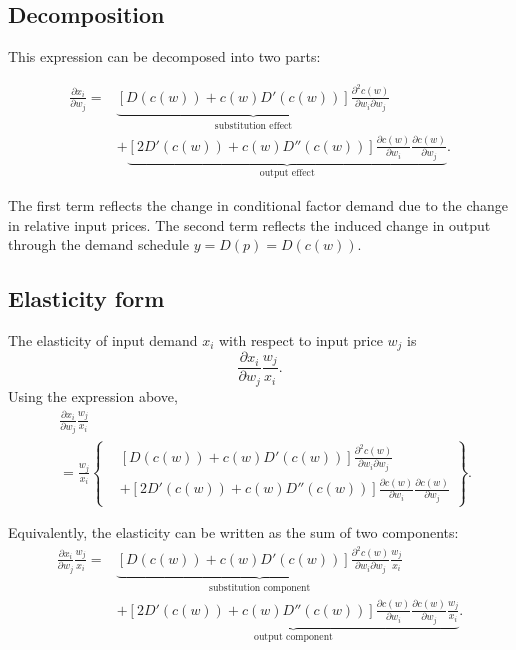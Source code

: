 \subsection*{Decomposition}

This expression can be decomposed into two parts:

\[
\begin{aligned}
\frac{\partial x_i}{\partial w_j}
=
&\underbrace{
\left[D(c(w))+c(w)D'(c(w))\right]\frac{\partial^2 c(w)}{\partial w_i\partial w_j}
}_{\text{substitution effect}}\\
&+
\underbrace{
\left[2D'(c(w))+c(w)D''(c(w))\right]
\frac{\partial c(w)}{\partial w_i}
\frac{\partial c(w)}{\partial w_j}
}_{\text{output effect}}.
\end{aligned}
\]

The first term reflects the change in conditional factor demand due to the change in relative input prices.  
The second term reflects the induced change in output through the demand schedule \(y=D(p)=D(c(w))\).

\subsection*{Elasticity form}

The elasticity of input demand \(x_i\) with respect to input price \(w_j\) is
\[
\frac{\partial x_i}{\partial w_j}\frac{w_j}{x_i}.
\]
Using the expression above,
\[
\boxed{
\begin{aligned}
&\frac{\partial x_i}{\partial w_j}\frac{w_j}{x_i}\\
&=
\frac{w_j}{x_i}
\left\{
\begin{aligned}
&\left[D(c(w))+c(w)D'(c(w))\right]\frac{\partial^2 c(w)}{\partial w_i\partial w_j}\\
&+
\left[2D'(c(w))+c(w)D''(c(w))\right]
\frac{\partial c(w)}{\partial w_i}
\frac{\partial c(w)}{\partial w_j}
\end{aligned}
\right\}.
\end{aligned}
}
\]

Equivalently, the elasticity can be written as the sum of two components:
\[
\begin{aligned}
\frac{\partial x_i}{\partial w_j}\frac{w_j}{x_i}
=
&\underbrace{
\left[D(c(w))+c(w)D'(c(w))\right]
\frac{\partial^2 c(w)}{\partial w_i\partial w_j}
\frac{w_j}{x_i}
}_{\text{substitution component}}\\
&+
\underbrace{
\left[2D'(c(w))+c(w)D''(c(w))\right]
\frac{\partial c(w)}{\partial w_i}
\frac{\partial c(w)}{\partial w_j}
\frac{w_j}{x_i}
}_{\text{output component}}.
\end{aligned}
\]

